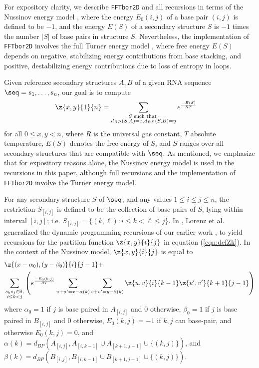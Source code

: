 For expository clarity, we describe {\tt FFTbor2D} and all recursions
in terms of the Nussinov energy model \cite{nussinovJacobson}, where
the energy $E_0(i,j)$ of a base pair $(i,j)$ is defined to be $-1$, and the
energy $E(S)$ of a secondary structure $S$ is $-1$ times the number $|S|$
of base pairs in structure $S$.  Nevertheless, the implementation of
{\tt FFTbor2D} involves the full Turner energy model \cite{xia:RNA}, where
free energy $E(S)$ depends on negative, stabilizing energy contributions
from base stacking, and positive, destabilizing energy contributions due to
loss of entropy in loops.

Given reference secondary structures $A,B$ of a
given RNA sequence $\seq=s_1,\ldots,s_n$, our goal is to compute
\begin{align}
\label{eqn:defZk}
\z{x,y}{1}{n} &= \sum_{\substack{S \text{ such that }\\
d_{BP}(S,A)=x, d_{BP}(S,B)=y}} e^{\frac{-E(S)}{RT}}
\end{align}
for all $0\leq x,y < n$, where $R$ is the universal gas constant, $T$
absolute temperature, $E(S)$ denotes the free energy of $S$, and $S$ ranges
over all secondary structures that are compatible with $\seq$. As mentioned,
we emphasize that for expository reasons alone, the Nussinov energy model is
used in the recursions in this paper, although full recursions and
the implementation of {\tt FFTbor2D} involve the Turner energy model.

For any secondary structure $S$ of $\seq$, and any values
$1\leq i\leq j \leq n$, the restriction $S_{[i,j]}$ is defined to be the
collection of base pairs of $S$, lying within interval $[i,j]$; i.e.
$S_{[i,j]} = \{ (k,\ell) : i \leq k < \ell \leq j\}$.
In \cite{hofacker:RNAbor2D}, Lorenz et al. generalized
the dynamic programming recursions of our earlier work \cite{Freyhult.b07},
to yield recursions
for the partition function $\z{x,y}{i}{j}$ in equation
(\ref{eqn:defZk}).  In the context of the Nussinov model,
$\z{x,y}{i}{j}$ is equal to
\begin{eqnarray}
\label{eqn:RNAborNussRecursion}
&\z{(x-\alpha_0),(y-\beta_0)}{i}{j-1} +  \\
&\sum_{\substack{s_k s_j \in \mathbb{B},\\i\le k<j}}
\left(e^{\frac{-E_0(k,j)}{RT}}
\sum_{u+u'=x-\alpha(k)} \sum_{v+v'=y-\beta(k)}
\z{u,v}{i}{k-1}  \z{u',v'}{k+1}{j-1} \right) \nonumber
\end{eqnarray}
where $\alpha_0 = 1$ if $j$ is base paired in $A_{[i,j]}$ and $0$ otherwise,
$\beta_0 = 1$ if $j$ is base paired in $B_{[i,j]}$ and $0$ otherwise,
$E_0(k,j)=-1$ if $k,j$ can base-pair, and otherwise $E_0(k,j)=0$, and
$\alpha(k)=d_{BP}(A_{[i,j]}, A_{[i,k-1]} \cup A_{[k+1,j-1]} \cup\{(k,j)\})$,
and
$\beta(k)=d_{BP}(B_{[i,j]}, B_{[i,k-1]} \cup B_{[k+1,j-1]} \cup\{(k,j)\})$.

